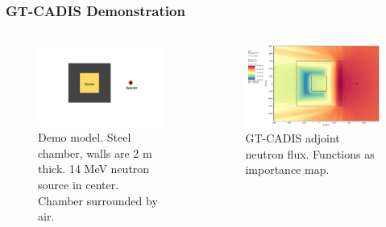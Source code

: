 \documentclass{beamer}
\begin{document}
\begin{frame}
\frametitle{GT-CADIS Demonstration}

	\begin{columns}
        \begin{figure}
		\hspace{-1cm}
	\includegraphics[scale=0.27, xshift=-3cm]{config-0.jpg}
		\vspace{-1.4cm}
	\caption{Demo model. Steel chamber, walls are 2 m thick.  14 MeV
		neutron source in center.  Chamber surrounded by air.}
        \end{figure}

        \begin{figure}
	\centering
	\includegraphics[scale=0.20]{gtcadis_adjn.jpg}
		\caption{GT-CADIS adjoint neutron flux. Functions as importance
		map.}
	\end{figure}
	\end{columns}

\end{frame}
\end{document}
